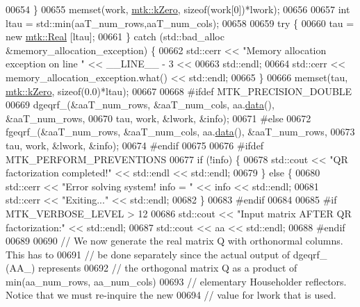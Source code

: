 \begin{DoxyCode}
00654   \}
00655   memset(work, \hyperlink{group__c01-roots_ga59a451a5fae30d59649bcda274fea271}{mtk::kZero}, \textcolor{keyword}{sizeof}(work[0])*lwork);
00656 
00657   \textcolor{keywordtype}{int} ltau = std::min(aaT\_num\_rows,aaT\_num\_cols);
00658 
00659   \textcolor{keywordflow}{try} \{
00660     tau = \textcolor{keyword}{new} \hyperlink{group__c01-roots_gac080bbbf5cbb5502c9f00405f894857d}{mtk::Real} [ltau];
00661   \} \textcolor{keywordflow}{catch} (std::bad\_alloc &memory\_allocation\_exception) \{
00662     std::cerr << \textcolor{stringliteral}{"Memory allocation exception on line "} << \_\_LINE\_\_ - 3 <<
00663       std::endl;
00664     std::cerr << memory\_allocation\_exception.what() << std::endl;
00665   \}
00666   memset(tau, \hyperlink{group__c01-roots_ga59a451a5fae30d59649bcda274fea271}{mtk::kZero}, \textcolor{keyword}{sizeof}(0.0)*ltau);
00667 
00668 \textcolor{preprocessor}{  #ifdef MTK\_PRECISION\_DOUBLE}
00669   dgeqrf\_(&aaT\_num\_rows, &aaT\_num\_cols, aa.\hyperlink{classmtk_1_1DenseMatrix_a0c33b8a9e01d157c61ddbdf807c25d84}{data}(), &aaT\_num\_rows,
00670           tau, work, &lwork, &info);
00671 \textcolor{preprocessor}{  #else}
00672   fgeqrf\_(&aaT\_num\_rows, &aaT\_num\_cols, aa.\hyperlink{classmtk_1_1DenseMatrix_a0c33b8a9e01d157c61ddbdf807c25d84}{data}(), &aaT\_num\_rows,
00673           tau, work, &lwork, &info);
00674 \textcolor{preprocessor}{  #endif}
00675 
00676 \textcolor{preprocessor}{  #ifdef MTK\_PERFORM\_PREVENTIONS}
00677   \textcolor{keywordflow}{if} (!info) \{
00678     std::cout << \textcolor{stringliteral}{"QR factorization completed!"} << std::endl << std::endl;
00679   \} \textcolor{keywordflow}{else} \{
00680     std::cerr << \textcolor{stringliteral}{"Error solving system! info = "} << info << std::endl;
00681     std::cerr << \textcolor{stringliteral}{"Exiting..."} << std::endl;
00682   \}
00683 \textcolor{preprocessor}{  #endif}
00684 
00685 \textcolor{preprocessor}{  #if MTK\_VERBOSE\_LEVEL > 12}
00686   std::cout << \textcolor{stringliteral}{"Input matrix AFTER QR factorization:"} << std::endl;
00687   std::cout << aa << std::endl;
00688 \textcolor{preprocessor}{  #endif}
00689 
00690   \textcolor{comment}{// We now generate the real matrix Q with orthonormal columns. This has to}
00691   \textcolor{comment}{// be done separately since the actual output of dgeqrf\_ (AA\_) represents}
00692   \textcolor{comment}{// the orthogonal matrix Q as a product of min(aa\_num\_rows, aa\_num\_cols)}
00693   \textcolor{comment}{// elementary Householder reflectors. Notice that we must re-inquire the new}
00694   \textcolor{comment}{// value for lwork that is used.}

\end{DoxyCode}
